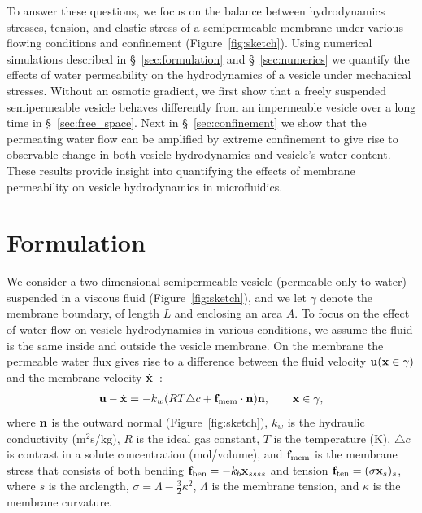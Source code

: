 \documentclass[prb,preprint,showpacs,preprintnumbers,amsmath,amssymb,longbibliography]{revtex4-1}
\begin{document}
To answer these
questions, we focus on the balance between hydrodynamics stresses,
tension, and elastic stress of a semipermeable membrane under various
flowing conditions and confinement (Figure~\ref{fig:sketch}).
%
Using numerical simulations described in \S~\ref{sec:formulation} and
\S~\ref{sec:numerics} we quantify the effects of water permeability on
the hydrodynamics of a vesicle under mechanical stresses.  Without an
osmotic gradient, we first show that a freely suspended semipermeable
vesicle behaves differently from an impermeable vesicle over a long time
in \S~\ref{sec:free_space}. Next in \S~\ref{sec:confinement} we show
that
the permeating water flow can be amplified by extreme confinement to give rise to observable change in both  vesicle hydrodynamics and vesicle's water content. 
These results provide insight into quantifying the effects of membrane permeability on vesicle hydrodynamics in microfluidics.
%
 

\section{Formulation\label{sec:formulation}}
We consider a two-dimensional semipermeable vesicle (permeable only to
water) suspended in a viscous fluid (Figure~\ref{fig:sketch}), and we
let $\gamma$ denote the membrane boundary, of length $L$ and enclosing an area $A$.
%
%
To focus on the effect of water flow on vesicle
hydrodynamics in various conditions, we assume the fluid is the same
inside and outside the vesicle membrane. On the membrane the permeable
water flux gives rise to a difference between the fluid velocity
${\mathbf{u}}({\mathbf{x}}\in \gamma)$ and the membrane velocity
$\dot{\mathbf{x}}$~\cite{yao-mor2017}:
\begin{align}
\label{eqn:water_flux}
  \mathbf{u} - \dot{\mathbf{x}} = - k_w (R T \triangle c + \mathbf{f}_\mathrm{mem} \cdot \mathbf{n}) \mathbf{n}, \qquad
  \mathbf{x} \in \gamma,
\end{align}
where $\mathbf{n}$ is the outward normal (Figure~\ref{fig:sketch}), $k_w$ is
the hydraulic conductivity (m$^2$s/kg), $R$ is the ideal gas constant,
$T$ is the temperature (K), $\triangle c$ is contrast in a solute
concentration (mol/volume), and $\mathbf{f}_\mathrm{mem}$ is the membrane
stress that consists of both bending $ \mathbf{f}_\mathrm{ben}= -k_b
\mathbf{x}_{ssss}$ and tension $\mathbf{f}_\mathrm{ten}=(\sigma \mathbf{x}_s)_s$, where $s$
is the arclength, $\sigma = \Lambda - \frac{3}{2}\kappa^2$, $\Lambda$ is the
membrane tension, and $\kappa$ is the membrane curvature. 
\end{document}
